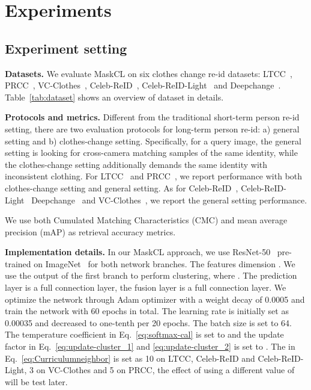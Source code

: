 \documentclass[10pt,twocolumn,letterpaper]{article}
\newcommand{\reid}{re-id}
\newcommand{\myparagraph}[1]{\noindent\textbf{#1.}}
\begin{document}
\section{Experiments}
\label{sec:Experiments}



\subsection{Experiment setting}

\myparagraph{Datasets}
\label{p:dataset-and-preprocessing}
We evaluate MaskCL on six clothes change re-id datasets: 
LTCC~\cite{Change:1}, PRCC~\cite{yang2019person}, VC-Clothes~\cite{vcclothes}, 
Celeb-ReID~\cite{celebreid}, 
Celeb-ReID-Light~\cite{celebreidlight} and Deepchange~\cite{Deepchange}.
Table~\ref{tab:dataset} shows an overview of dataset in details.















\myparagraph{Protocols and metrics}
\label{p:protocols-and-metrics}
Different from the traditional short-term person \reid{} setting, 
there are two evaluation protocols for long-term person \reid{}: a) general setting and b) clothes-change setting. Specifically, for a query image, the general setting is looking for cross-camera matching samples of the same identity, while the clothes-change setting additionally demands the same identity with inconsistent clothing.
For LTCC~\cite{Change:1} and PRCC~\cite{yang2019person}, we report performance with both clothes-change setting  and general setting. As for Celeb-ReID~\cite{celebreid}, Celeb-ReID-Light~\cite{celebreidlight} Deepchange~\cite{Deepchange} and VC-Clothes~\cite{vcclothes}, we report the general setting performance.

We use both Cumulated Matching Characteristics (CMC) and mean average precision (mAP) as retrieval accuracy metrics.


\myparagraph{Implementation details} In our MaskCL approach, we use ResNet-50~\cite{he:CVPR16resnet} pre-trained on ImageNet~\cite{Krizhevsky:NIPS12} for both  network branches.
The features dimension .
We use the output  of the first branch  to perform clustering, where . 
The prediction layer  is a  full connection layer, the fusion layer  is a  full connection layer. 
We optimize the network through Adam optimizer \cite{Kingma:arXiv2014} with a weight decay of 0.0005 and train the network with 60 epochs in total. The learning rate is initially set as 0.00035 and decreased to one-tenth per 20 epochs. 
The batch size is set to 64. 
The temperature coefficient  in Eq.~\eqref{eq:softmax-cal} is set to  and the update factor  in Eq.~\eqref{eq:update-cluster_1} and \eqref{eq:update-cluster_2} is set to . The  in Eq.~\eqref{eq:Curriculumneighbor} is set as 10 on LTCC, Celeb-ReID
and Celeb-ReID-Light, 3 on VC-Clothes and 5 on PRCC, the effect of using a different value of  will be test later. 
\end{document}
